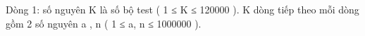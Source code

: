 Dòng 1: số nguyên K là số bộ test ( 1 ≤ K ≤ 120000 ). K dòng tiếp theo mỗi dòng gồm 2 số nguyên a , n ( 1 ≤ a, n ≤ 1000000 ).  

\